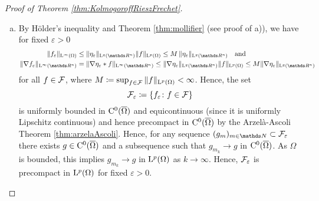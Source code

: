 \begin{proof}[Proof of Theorem \ref{thm:KolmogoroffRieszFrechet}]
\begin{enumerate}[I)]
\begin{enumerate}[a)]
      \item By Hölder's inequality and Theorem \ref{thm:mollifier} (see proof of a)), we have for fixed $\varepsilon > 0$
         \begin{align*}
           \| f_\varepsilon\|_{\Ell^\infty(\Omega)}
           &\leq \|\eta_\varepsilon \|_{\Ell^q(\R^n)} \|f\|_{\Ell^p(\Omega)}
           \leq M \, \|\eta_\varepsilon \|_{\Ell^q(\R^n)} \quad\text{and} \\
           \|\nabla f_\varepsilon \|_{\Ell^\infty(\R^n)}
           &= \| \nabla \eta_\varepsilon \ast f \|_{\Ell^\infty(\R^n)}
           \leq \| \nabla \eta_\varepsilon \|_{\Ell^q(\R^n)} \|f\|_{\Ell^p(\Omega)}
           \leq M \|\nabla \eta_\varepsilon \|_{\Ell^q(\R^n)} 
         \end{align*}
         for all $f \in \mathcal{F}$, where $M \coloneqq \sup_{f \in \mathcal{F}} \| f\|_{\mathrm{L}^p(\Omega)} < \infty$.
         Hence, the set $$\mathcal{F}_\varepsilon \coloneqq \{ f_\varepsilon \colon f \in \mathcal{F} \}$$ is uniformly bounded in $\mathrm{C}^0(\overline\Omega)$ and equicontinuous (since it is uniformly Lipschitz continuous) and hence precompact in $\mathrm{C}^0(\overline\Omega)$ by the Arzel\`a-Ascoli Theorem \ref{thm:arzelaAscoli}.
        Hence, for any sequence $(g_m)_{m \in \N} \subset \FF_\varepsilon$ there exists $g \in \mathrm{C}^0(\overline\Omega)$ and a subsequence such that $g_{m_k} \to g$ in $\mathrm{C}^0(\overline\Omega)$.
        As $\Omega$ is bounded, this implies $g_{m_k} \to g$ in $\mathrm{L}^p(\Omega)$ as $k \to \infty$.
        Hence, $\mathcal{F}_\varepsilon$ is precompact in $\mathrm{L}^p(\Omega)$ for fixed $\varepsilon > 0$.


\end{enumerate}
\end{enumerate}
\end{proof}
